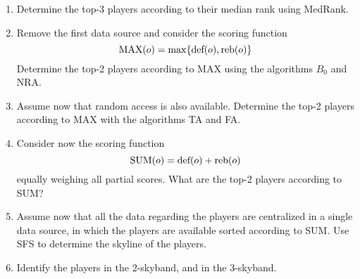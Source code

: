 \begin{enumerate}
    \item Determine the top-3 players according to their median rank using MedRank.
    \item Remove the first data source and consider the scoring function
        \[\textnormal{MAX}(o) = \max\{\textnormal{def}(o), \textnormal{reb}(o)\}\] 
        Determine the top-2 players according to MAX using the algorithms $B_0$ and NRA.
    \item Assume now that random access is also available. Determine the top-2 players according to MAX with the algorithms TA and FA.
    \item Consider now the scoring function 
        \[\textnormal{SUM}(o) = \textnormal{def}(o) + \textnormal{reb}(o)\] 
        equally weighing all partial scores. What are the top-2 players according to SUM?
    \item Assume now that all the data regarding the players are centralized in a single data source, in which the players are available sorted according to SUM. 
        Use SFS to determine the skyline of the players.
    \item Identify the players in the 2-skyband, and in the 3-skyband.
\end{enumerate}

